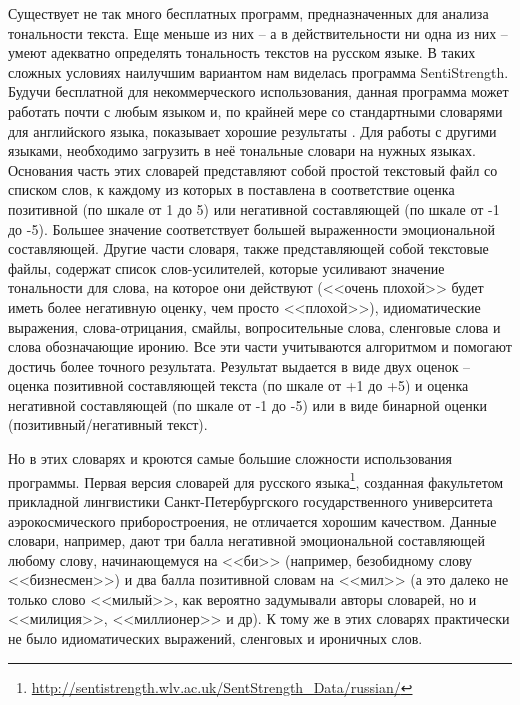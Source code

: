 Существует не так много бесплатных программ, предназначенных для анализа тональности текста. Еще меньше из них -- а в действительности ни одна из них -- умеют адекватно определять тональность текстов на русском языке. В таких сложных условиях наилучшим вариантом нам виделась программа SentiStrength. Будучи бесплатной для некоммерческого использования, данная программа может работать почти с любым языком и, по крайней мере со стандартными словарями для английского языка, показывает хорошие результаты \cite{SentiStrength}. Для работы с другими языками, необходимо загрузить в неё тональные словари на нужных языках. Основания часть этих словарей представляют собой простой текстовый файл со списком слов, к каждому из которых в поставлена в соответствие оценка позитивной (по шкале от 1 до 5) или негативной составляющей (по шкале от -1 до -5). Большее значение соответствует большей выраженности эмоциональной составляющей. Другие части словаря, также представляющей собой текстовые файлы, содержат список слов-усилителей, которые усиливают значение тональности для слова, на которое они действуют (<<очень плохой>> будет иметь более негативную оценку, чем просто <<плохой>>), идиоматические выражения, слова-отрицания, смайлы, вопросительные слова, сленговые слова и слова обозначающие иронию. Все эти части учитываются алгоритмом и помогают достичь более точного результата. Результат выдается в виде двух оценок – оценка позитивной составляющей текста (по шкале от +1 до +5) и оценка негативной составляющей (по шкале от -1 до -5) или в виде бинарной оценки (позитивный/негативный текст).

Но в этих словарях и кроются самые большие сложности использования программы. Первая версия словарей для русского языка\footnote{\href{http://sentistrength.wlv.ac.uk/SentStrength\_Data/russian/}{http://sentistrength.wlv.ac.uk/SentStrength\_Data/russian/}}, созданная факультетом прикладной лингвистики Санкт-Петербургского государственного университета аэрокосмического приборостроения, не отличается хорошим качеством. Данные словари, например, дают три балла негативной эмоциональной составляющей любому слову, начинающемуся на <<би>> (например, безобидному слову <<бизнесмен>>) и два балла позитивной словам на <<мил>> (а это далеко не только слово <<милый>>, как вероятно задумывали авторы словарей, но и <<милиция>>, <<миллионер>> и др). К тому же в этих словарях практически не было идиоматических выражений, сленговых и ироничных слов.

